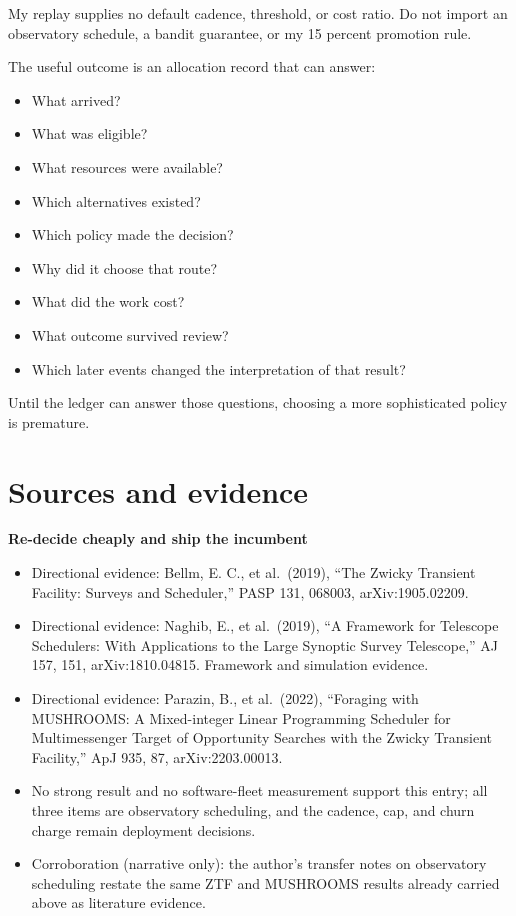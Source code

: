 My replay supplies no default cadence, threshold, or cost ratio. Do not import an observatory schedule, a bandit guarantee, or my 15 percent promotion rule.

The useful outcome is an allocation record that can answer:

\begin{itemize}
\tightlist
\item
  What arrived?
\item
  What was eligible?
\item
  What resources were available?
\item
  Which alternatives existed?
\item
  Which policy made the decision?
\item
  Why did it choose that route?
\item
  What did the work cost?
\item
  What outcome survived review?
\item
  Which later events changed the interpretation of that result?
\end{itemize}

Until the ledger can answer those questions, choosing a more sophisticated policy is premature.

\section*{Sources and evidence}

\textbf{Re-decide cheaply and ship the incumbent}

\begin{itemize}
\tightlist
\item
  Directional evidence: Bellm, E. C., et al.~(2019), ``The Zwicky Transient Facility: Surveys and Scheduler,'' PASP 131, 068003, arXiv:1905.02209.
\item
  Directional evidence: Naghib, E., et al.~(2019), ``A Framework for Telescope Schedulers: With Applications to the Large Synoptic Survey Telescope,'' AJ 157, 151, arXiv:1810.04815. Framework and simulation evidence.
\item
  Directional evidence: Parazin, B., et al.~(2022), ``Foraging with MUSHROOMS: A Mixed-integer Linear Programming Scheduler for Multimessenger Target of Opportunity Searches with the Zwicky Transient Facility,'' ApJ 935, 87, arXiv:2203.00013.
\item
  No strong result and no software-fleet measurement support this entry; all three items are observatory scheduling, and the cadence, cap, and churn charge remain deployment decisions.
\item
  Corroboration (narrative only): the author's transfer notes on observatory scheduling restate the same ZTF and MUSHROOMS results already carried above as literature evidence.
\end{itemize}

